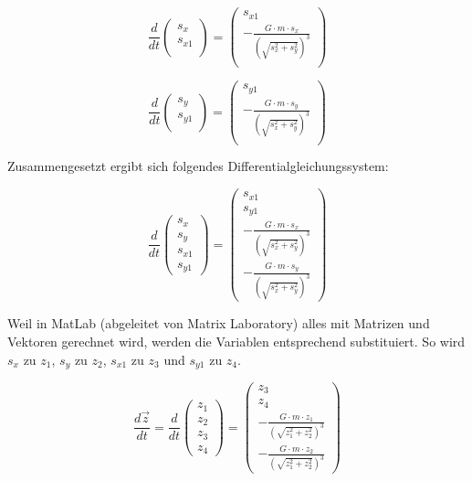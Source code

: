 \begin{refsection}
\begin{equation}
\frac{d}{dt} \begin{pmatrix}
s_x \\ 
s_{x1}\\
\end{pmatrix} = \begin{pmatrix}
s_{x1} \\ 
-\frac{G \cdot m \cdot s_x}{(\sqrt{s_x^2 + s_y^2})^3} \\
\end{pmatrix}
\end{equation}

\begin{equation}
\frac{d}{dt} \begin{pmatrix}
s_y \\ 
s_{y1}\\
\end{pmatrix} = \begin{pmatrix}
s_{y1} \\ 
-\frac{G \cdot m \cdot s_y}{(\sqrt{s_x^2 + s_y^2})^3} \\
\end{pmatrix}
\end{equation}

Zusammengesetzt ergibt sich folgendes Differentialgleichungssystem:

\begin{equation}
\frac{d}{dt} \begin{pmatrix}
s_x \\ 
s_y \\
s_{x1}\\
s_{y1}
\end{pmatrix} = \begin{pmatrix}
s_{x1} \\ 
s_{y1}\\
-\frac{G \cdot m \cdot s_x}{(\sqrt{s_x^2 + s_y^2})^3} \\
-\frac{G \cdot m \cdot s_y}{(\sqrt{s_x^2 + s_y^2})^3}
\end{pmatrix}
\end{equation}

Weil in MatLab (abgeleitet von Matrix Laboratory) alles mit Matrizen und Vektoren gerechnet wird, werden die Variablen entsprechend substituiert. So wird $s_x$ zu $z_1$, $s_y$ zu $z_2$, $s_{x1}$ zu $z_3$ und $s_{y1}$ zu $z_4$.

\begin{equation}\label{eq:zustandsraumdarst}
\frac{d \vec{z}}{dt}=\frac{d}{dt} \begin{pmatrix}
z_1 \\ 
z_2 \\
z_3 \\
z_4
\end{pmatrix} = \begin{pmatrix}
z_3 \\ 
z_4 \\
-\frac{G \cdot m \cdot z_1}{(\sqrt{z_1^2 + z_2^2})^3} \\
-\frac{G \cdot m \cdot z_2}{(\sqrt{z_1^2 + z_2^2})^3}
\end{pmatrix}
\end{equation}


\end{refsection}
